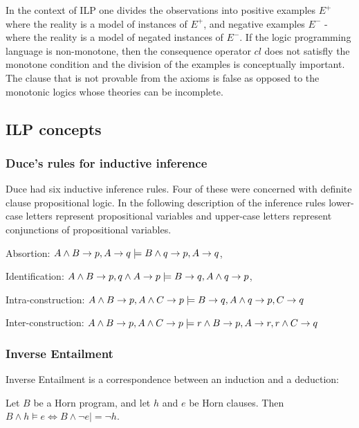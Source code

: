 In the context of ILP one divides the observations into positive examples $E^+$ where the reality is a model of instances of $E^+$, and negative examples $E^-$ - where the reality is a model of negated instances of $E^-$. If the logic programming language is non-monotone, then the consequence operator $cl$ does not satisfly the monotone condition and the division of the examples is conceptually important. The clause that is not provable from the axioms is false as opposed to the monotonic logics whose theories can be incomplete.

\subsection{ILP concepts}

\subsubsection{Duce's rules for inductive inference\cite{muggleton1995}}
Duce had six inductive inference rules. Four of these were concerned with definite clause propositional logic. In the following description of the inference rules
lower-case letters represent propositional variables and upper-case letters represent conjunctions of propositional variables.

Absortion: $A \wedge B \to p, A \to q \models B \wedge q \to p, A \to q$,

Identification: $A \wedge B \to p, q \wedge A \to p
\models B \to q, A \wedge q \to p$,

Intra-construction: $A \wedge B \to p, A \wedge C \to p
\models B \to q, A \wedge q \to p, C \to q$

Inter-construction: $A \wedge B \to p, A \wedge C \to p
\models r \wedge B \to p, A \to r, r \wedge C \to q$

\subsubsection{Inverse Entailment}
Inverse Entailment is a correspondence between an induction and a deduction:
\begin{thm}\cite{kimber2011}
Let $B$ be a Horn program, and let $h$ and $e$ be
Horn clauses. Then $B \wedge h \models e \iff B \wedge \neg e |= \neg h$.
\end{thm}

